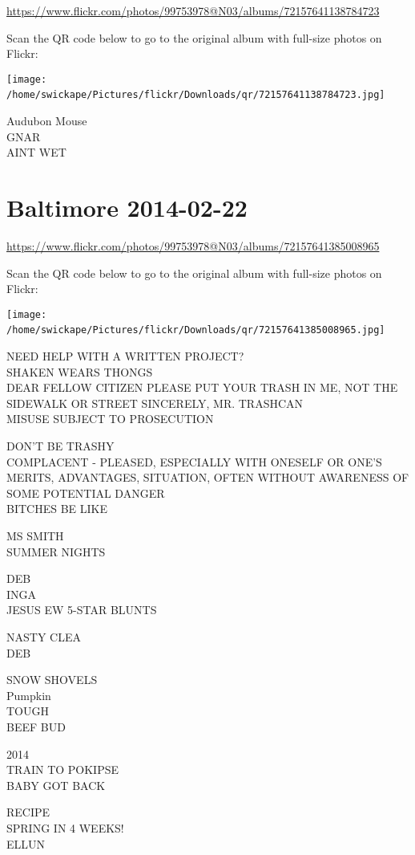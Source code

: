 \documentclass[10pt,letterpaper]{article}
\begin{document}
\url{https://www.flickr.com/photos/99753978@N03/albums/72157641138784723}

Scan the QR code below to go to the original album with full-size photos on Flickr:

\texttt{[image: /home/swickape/Pictures/flickr/Downloads/qr/72157641138784723.jpg]}
\

Audubon Mouse\\
GNAR\\
AINT WET
\

\section*{Baltimore 2014-02-22}

\url{https://www.flickr.com/photos/99753978@N03/albums/72157641385008965}

Scan the QR code below to go to the original album with full-size photos on Flickr:

\texttt{[image: /home/swickape/Pictures/flickr/Downloads/qr/72157641385008965.jpg]}
\

NEED HELP WITH A WRITTEN PROJECT?\\
SHAKEN WEARS THONGS\\
DEAR FELLOW CITIZEN PLEASE PUT YOUR TRASH IN ME, NOT THE SIDEWALK OR STREET SINCERELY, MR. TRASHCAN\\
MISUSE SUBJECT TO PROSECUTION

DON'T BE TRASHY\\
COMPLACENT {-} PLEASED, ESPECIALLY WITH ONESELF OR ONE'S MERITS, ADVANTAGES, SITUATION, OFTEN WITHOUT AWARENESS OF SOME POTENTIAL DANGER\\
BITCHES BE LIKE

MS SMITH\\
SUMMER NIGHTS

DEB\\
INGA\\
JESUS EW 5{-}STAR BLUNTS

NASTY CLEA\\
DEB

SNOW SHOVELS\\
Pumpkin\\
TOUGH\\
BEEF BUD

2014\\
TRAIN TO POKIPSE\\
BABY GOT BACK

RECIPE\\
SPRING IN 4 WEEKS!\\
ELLUN
\end{document}
